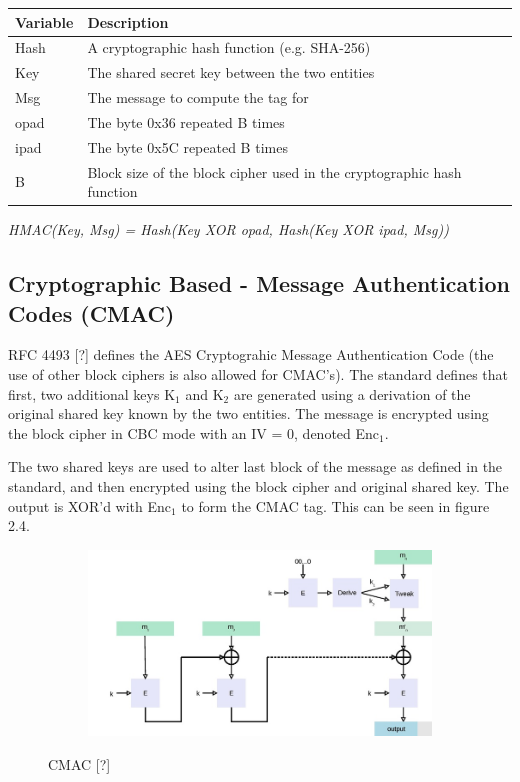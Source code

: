 \documentclass[bsc,frontabs,twoside,singlespacing,parskip,deptreport]{infthesis}     %
\begin{document}
\begin{table}[H]
\begin{tabular}{|l|l|}
\hline
Variable & Description\\
\hline
Hash & A cryptographic hash function (e.g. SHA-256)\\
\hline
Key & The shared secret key between the two entities\\
\hline
Msg & The message to compute the tag for\\
\hline
opad & The byte 0x36 repeated B times\\
\hline
ipad & The byte 0x5C repeated B times\\
\hline
B & Block size of the block cipher used in the cryptographic hash function\\
\hline
\end{tabular}
\end{table}

\begin{center}
\textit{HMAC(Key, Msg) = Hash(Key XOR opad, Hash(Key XOR ipad, Msg))}
\end{center}


\subsection{Cryptographic Based - Message Authentication Codes (CMAC)}

RFC 4493 [?] defines the AES Cryptograhic Message Authentication Code (the use of other block ciphers is also allowed for CMAC's). The standard defines that first, two additional keys K$_1$ and K$_2$ are generated using a derivation of the original shared key known by the two entities. The message is encrypted using the block cipher in CBC mode with an IV = 0, denoted Enc$_1$. 

The two shared keys are used to alter last block of the message as defined in the standard, and then encrypted using the block cipher and original shared key. The output is XOR'd with Enc$_1$ to form the CMAC tag. This can be seen in figure 2.4.


\begin{figure}[H]
\centering
\begin{subfigure}{1.2\textwidth}
  \includegraphics[width=1\linewidth]
  {images/crypto/CMAC.jpg}
\end{subfigure}
\caption{CMAC [?]}
\end{figure}
\end{document}
